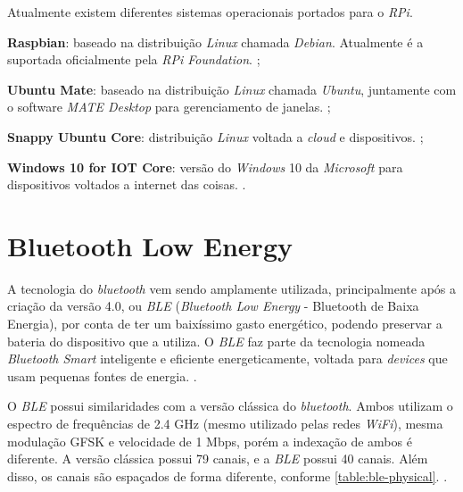Atualmente existem diferentes sistemas operacionais portados para o \textit{RPi}.

\begin{alineas}
	\item \textbf{Raspbian}: baseado na distribuição \textit{Linux} chamada \textit{Debian}. Atualmente é a suportada oficialmente pela \textit{RPi Foundation}. \cite{rpi-download};
	\item \textbf{Ubuntu Mate}: baseado na distribuição \textit{Linux} chamada \textit{Ubuntu}, juntamente com o software \textit{MATE Desktop} para gerenciamento de janelas. \cite{ubuntu-mate};
	\item \textbf{Snappy Ubuntu Core}: distribuição \textit{Linux} voltada a \textit{cloud} e dispositivos. \cite{snappy-ubuntu};
	\item \textbf{Windows 10 for IOT Core}: versão do \textit{Windows} 10 da \textit{Microsoft} para dispositivos voltados a internet das coisas. \cite{windows10-iot}.
\end{alineas}

\section{Bluetooth Low Energy}\label{sec:ble}

A tecnologia do \textit{bluetooth} vem sendo amplamente utilizada, principalmente após a criação da versão 4.0, ou \textit{BLE} (\textit{Bluetooth Low Energy} - Bluetooth de Baixa Energia), por conta de ter um baixíssimo gasto energético, podendo preservar a bateria do dispositivo que a utiliza. O \textit{BLE} faz parte da tecnologia nomeada \textit{Bluetooth Smart} inteligente e eficiente energeticamente, voltada para \textit{devices} que usam pequenas fontes de energia. \cite{bluetooth-smart}.

O \textit{BLE} possui similaridades com a versão clássica do \textit{bluetooth}. Ambos utilizam o espectro de frequências de 2.4 GHz (mesmo utilizado pelas redes \textit{WiFi}), mesma modulação GFSK e velocidade de 1 Mbps, porém a indexação de ambos é diferente. A versão clássica possui 79 canais, e a \textit{BLE} possui 40 canais. Além disso, os canais são espaçados de forma diferente, conforme \autoref{table:ble-physical}. \cite{ble-packets}.

\begin{table}[htb]
\end{table}

